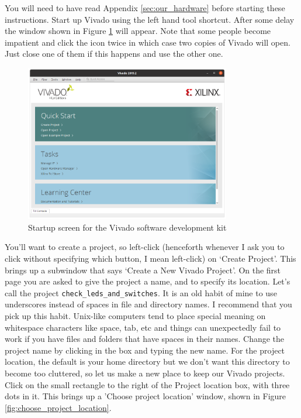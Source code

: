 \documentclass[../physical_computing.tex]{subfiles}
\begin{document}
You will need to have read Appendix \ref{sec:our_hardware} before starting these instructions. Start up Vivado using the left hand tool shortcut. After some delay the window shown in Figure \ref{fig:vivado_startup} will appear. Note that some people become impatient and click the icon twice in which case two copies of Vivado will open. Just close one of them if this happens and use the other one.

\begin{figure}[htbp]
    \centering
    \includegraphics[width=0.8\textwidth]{figures/vivado_startup.png}
    \caption{Startup screen for the Vivado software development kit}
    \label{fig:vivado_startup}
\end{figure}

You'll want to create a project, so left-click (henceforth whenever I ask you to click without specifying which button, I mean left-click) on `Create Project'. This brings up a subwindow that says `Create a New Vivado Project'. On the first page you are asked to give the project a name, and to specify its location. Let's call the project \texttt{check\_leds\_and\_switches}. It is an old habit of mine to use underscores instead of spaces in file and directory names. I recommend that you pick up this habit. Unix-like computers tend to place special meaning on whitespace characters like space, tab, etc and things can unexpectedly fail to work if you have files and folders that have spaces in their names. Change the project name by clicking in the box and typing the new name. For the project location, the default is your home directory but we don't want this directory to become too cluttered, so let us make a new place to keep our Vivado projects. Click on the small rectangle to the right of the Project location box, with three dots in it. This brings up a 'Choose project location' window, shown in Figure \ref{fig:choose_project_location}. 
\end{document}
